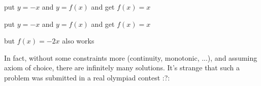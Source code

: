 \begin{solution}
	put $y=-x$ and $y=f(x)$ and get $f(x)=x$
\end{solution}



\begin{solution}
	\begin{tcolorbox}put $y=-x$ and $y=f(x)$ and get $f(x)=x$\end{tcolorbox}
but $f(x)=-2x$ also works
\end{solution}



\begin{solution}
	In fact, without some constraints more (continuity, monotonic, ...), and assuming axiom of choice, there are infinitely many solutions.
It's strange that such a problem was submitted in a real olympiad contest :?:
\end{solution}



